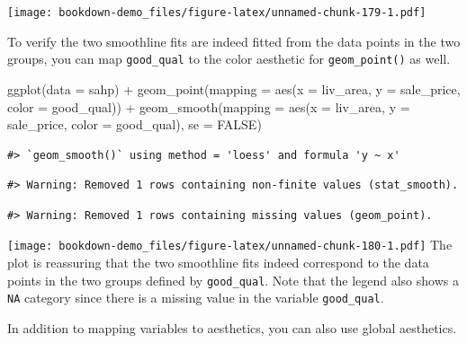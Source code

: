 \documentclass[
]{book}
\newenvironment{Shaded}{\begin{snugshade}}{\end{snugshade}}
\newcommand{\AttributeTok}[1]{\textcolor[rgb]{0.77,0.63,0.00}{#1}}
\newcommand{\ConstantTok}[1]{\textcolor[rgb]{0.00,0.00,0.00}{#1}}
\newcommand{\FunctionTok}[1]{\textcolor[rgb]{0.00,0.00,0.00}{#1}}
\newcommand{\NormalTok}[1]{#1}
\newcommand{\SpecialCharTok}[1]{\textcolor[rgb]{0.00,0.00,0.00}{#1}}
\begin{document}
\texttt{[image: bookdown-demo\_files/figure-latex/unnamed-chunk-179-1.pdf]}

To verify the two smoothline fits are indeed fitted from the data points in the two groups, you can map \texttt{good\_qual} to the color aesthetic for \texttt{geom\_point()} as well.

\begin{Shaded}
\begin{Highlighting}[]
\FunctionTok{ggplot}\NormalTok{(}\AttributeTok{data =}\NormalTok{ sahp) }\SpecialCharTok{+} \FunctionTok{geom\_point}\NormalTok{(}\AttributeTok{mapping =} \FunctionTok{aes}\NormalTok{(}\AttributeTok{x =}\NormalTok{ liv\_area, }\AttributeTok{y =}\NormalTok{ sale\_price, }\AttributeTok{color =}\NormalTok{ good\_qual)) }\SpecialCharTok{+} \FunctionTok{geom\_smooth}\NormalTok{(}\AttributeTok{mapping =} \FunctionTok{aes}\NormalTok{(}\AttributeTok{x =}\NormalTok{ liv\_area, }\AttributeTok{y =}\NormalTok{ sale\_price, }\AttributeTok{color =}\NormalTok{ good\_qual), }\AttributeTok{se =} \ConstantTok{FALSE}\NormalTok{)}
\end{Highlighting}
\end{Shaded}

\begin{verbatim}
#> `geom_smooth()` using method = 'loess' and formula 'y ~ x'
\end{verbatim}

\begin{verbatim}
#> Warning: Removed 1 rows containing non-finite values (stat_smooth).
\end{verbatim}

\begin{verbatim}
#> Warning: Removed 1 rows containing missing values (geom_point).
\end{verbatim}

\texttt{[image: bookdown-demo\_files/figure-latex/unnamed-chunk-180-1.pdf]}
The plot is reassuring that the two smoothline fits indeed correspond to the data points in the two groups defined by \texttt{good\_qual}. Note that the legend also shows a \texttt{NA} category since there is a missing value in the variable \texttt{good\_qual}.

In addition to mapping variables to aesthetics, you can also use global aesthetics.
\end{document}
